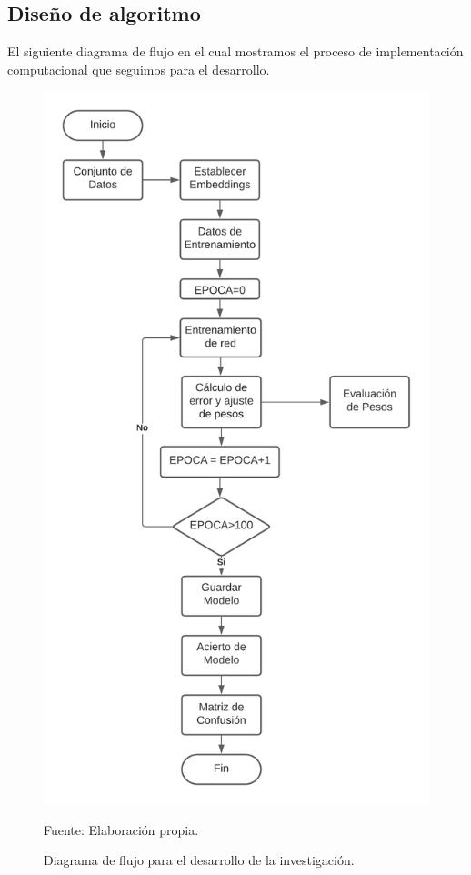 \newpage

\subsection{Diseño de algoritmo}

El siguiente diagrama de flujo en el cual mostramos el proceso de implementación computacional que seguimos para el desarrollo.

\begin{figure}[H]
	\centering
		\includegraphics[scale=0.7]{imagenes/flujograma.png}
		\caption{Diagrama de flujo para el desarrollo de la investigación.}
	\begin{center}
    Fuente: Elaboración propia.
    \end{center}
	\label{fig:39}
\end{figure}
\newpage
